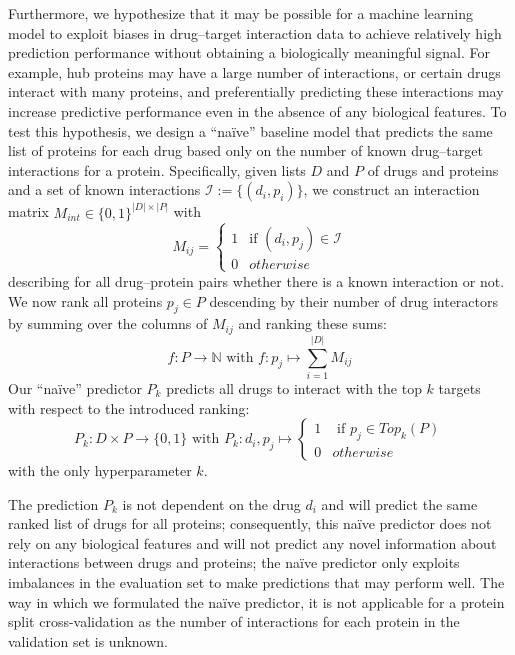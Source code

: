 \documentclass{bioinfo}
\begin{document}
Furthermore, we hypothesize that it may be possible for a machine
learning model to exploit biases in drug--target interaction data to
achieve relatively high prediction performance without obtaining a
biologically meaningful signal.  For example, hub proteins may have a
large number of interactions, or certain drugs interact with many
proteins, and preferentially predicting these interactions may
increase predictive performance even in the absence of any biological
features.  To test this hypothesis, we design a ``na\"ive'' baseline
model that predicts the same list of proteins for each drug based only
on the number of known drug--target interactions for a
protein. Specifically, given lists $D$ and $P$ of drugs and proteins
and a set of known interactions $\mathcal{I} := \{(d_i, p_i) \}$, we
construct an interaction matrix $M_{int}\in\{0,1\}^{|D|\times|P|}$
with
\begin{equation*}
	M_{ij} = \begin{cases}
		1 & \text{if } (d_i, p_j)\in \mathcal{I}\\
		0 & otherwise
	\end{cases}
\end{equation*}
describing for all drug--protein pairs whether there is a known
interaction or not. We now rank all proteins $p_j\in P$ descending by
their number of drug interactors by summing over the columns of
$M_{ij}$ and ranking these sums:
\begin{equation*}
	f: P \rightarrow \mathbb{N} \text{ with } f:p_j \mapsto \sum_{i=1}^{|D|}M_{ij}
\end{equation*}
Our ``na\"ive'' predictor $P_k$ predicts all drugs to interact with
the top $k$ targets with respect to the introduced ranking:
\begin{equation*}
	P_k: D\times P \rightarrow \{0,1\} \text{ with } P_k: d_i, p_j \mapsto \begin{cases}
		1 & \text{ if }p_j \in Top_{k}(P)\\
		0 & otherwise
	\end{cases}
\end{equation*}
with the only hyperparameter $k$.

The prediction $P_k$ is not dependent on the drug $d_i$ and will
predict the same ranked list of drugs for all proteins; consequently,
this na\"ive predictor does not rely on any biological features and
will not predict any novel information about interactions between
drugs and proteins; the na\"ive predictor only exploits imbalances in
the evaluation set to make predictions that may perform well.  The way
in which we formulated the na\"ive predictor, it is not applicable for
a protein split cross-validation as the number of interactions for
each protein in the validation set is unknown.
\end{document}
